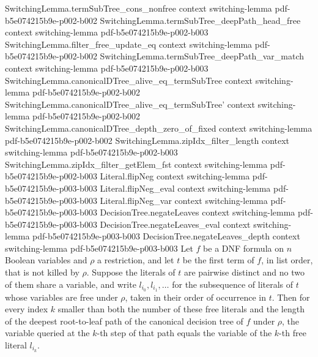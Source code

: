 \begin{lemma}
\proofstep
  {SwitchingLemma.termSubTree_cons_nonfree}
  {context}
  {switching-lemma}
  {pdf-b5e074215b9e-p002-b002}
\proofstep
  {SwitchingLemma.termSubTree_deepPath_head_free}
  {context}
  {switching-lemma}
  {pdf-b5e074215b9e-p002-b003}
\proofstep
  {SwitchingLemma.filter_free_update_eq}
  {context}
  {switching-lemma}
  {pdf-b5e074215b9e-p002-b002}
\proofstep
  {SwitchingLemma.termSubTree_deepPath_var_match}
  {context}
  {switching-lemma}
  {pdf-b5e074215b9e-p002-b003}
\proofstep
  {SwitchingLemma.canonicalDTree_alive_eq_termSubTree}
  {context}
  {switching-lemma}
  {pdf-b5e074215b9e-p002-b002}
\proofstep
  {SwitchingLemma.canonicalDTree_alive_eq_termSubTree'}
  {context}
  {switching-lemma}
  {pdf-b5e074215b9e-p002-b002}
\proofstep
  {SwitchingLemma.canonicalDTree_depth_zero_of_fixed}
  {context}
  {switching-lemma}
  {pdf-b5e074215b9e-p002-b002}
\proofstep
  {SwitchingLemma.zipIdx_filter_length}
  {context}
  {switching-lemma}
  {pdf-b5e074215b9e-p002-b003}
\proofstep
  {SwitchingLemma.zipIdx_filter_getElem_fst}
  {context}
  {switching-lemma}
  {pdf-b5e074215b9e-p002-b003}
\proofstep
  {Literal.flipNeg}
  {context}
  {switching-lemma}
  {pdf-b5e074215b9e-p003-b003}
\proofstep
  {Literal.flipNeg_eval}
  {context}
  {switching-lemma}
  {pdf-b5e074215b9e-p003-b003}
\proofstep
  {Literal.flipNeg_var}
  {context}
  {switching-lemma}
  {pdf-b5e074215b9e-p003-b003}
\proofstep
  {DecisionTree.negateLeaves}
  {context}
  {switching-lemma}
  {pdf-b5e074215b9e-p003-b003}
\proofstep
  {DecisionTree.negateLeaves_eval}
  {context}
  {switching-lemma}
  {pdf-b5e074215b9e-p003-b003}
\proofstep
  {DecisionTree.negateLeaves_depth}
  {context}
  {switching-lemma}
  {pdf-b5e074215b9e-p003-b003}
Let $f$ be a DNF formula on $n$ Boolean variables and $\rho$ a restriction, and let $t$
be the first term of $f$, in list order, that is not killed by $\rho$. Suppose the
literals of $t$ are pairwise distinct and no two of them share a variable, and write
$l_{i_0}, l_{i_1}, \ldots$ for the subsequence of literals of $t$ whose variables are
free under $\rho$, taken in their order of occurrence in $t$. Then for every index $k$
smaller than both the number of these free literals and the length of the deepest
root-to-leaf path of the canonical decision tree of $f$ under $\rho$, the variable
queried at the $k$-th step of that path equals the variable of the $k$-th free literal
$l_{i_k}$.
\end{lemma}

